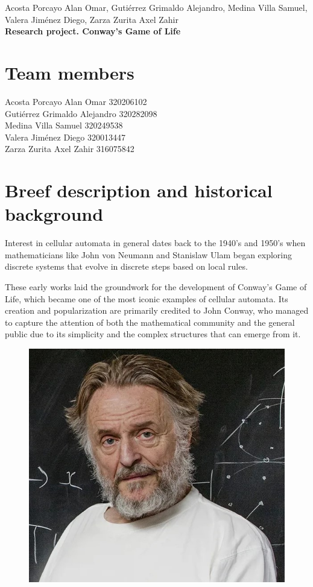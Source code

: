 \documentclass[12pt]{article}
\newcommand{\linejump}{\hfill \break}
\begin{document}
  \begin{center}
    Acosta Porcayo Alan Omar, Gutiérrez Grimaldo Alejandro, Medina Villa Samuel, Valera Jiménez Diego, Zarza Zurita Axel Zahir \\
    \linejump
    \LARGE \textbf{Research project. Conway's Game of Life} \\
  \end{center}

  \section*{Team members}
  Acosta Porcayo Alan Omar 320206102 \\
  Gutiérrez Grimaldo Alejandro 320282098 \\
  Medina Villa Samuel 320249538 \\
  Valera Jiménez Diego 320013447 \\
  Zarza Zurita Axel Zahir 316075842

  \section*{Breef description and historical background}
  Interest in cellular automata in general dates back to the 1940's and 1950's when mathematicians like John von Neumann and Stanislaw Ulam began exploring discrete systems that evolve in discrete steps based on local rules. 
  
  These early works laid the groundwork for the development of Conway's Game of Life, which became one of the most iconic examples of cellular automata. Its creation and popularization are primarily credited to John Conway, who managed to capture the attention of both the mathematical community and the general public due to its simplicity and the complex structures that can emerge from it.
  
  \begin{figure}
    \centering
    \includegraphics[width=\linewidth, center]{conway.jpg}
  \end{figure}
  
\end{document}
